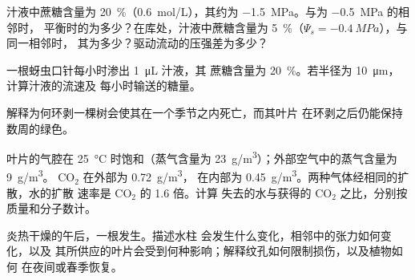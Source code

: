 \begin{exercise}[$\star\star$]\label{exo:b1:plant-transport:7}
汁液中蔗糖含量为 \qty{20}{\%}（\qty{0.6}{mol/L}），其约为
\qty{-1.5}{MPa}。与为 \qty{-0.5}{MPa} 的相邻时，
平衡时的为多少？在库处，汁液中蔗糖含量为
\qty{5}{\%}（$\Psi_s = \qty{-0.4}{MPa}$），与同一相邻时，
其为多少？驱动流动的压强差为多少？
\end{exercise}

\begin{exercise}[$\star\star$]\label{exo:b1:plant-transport:8}
一根蚜虫口针每小时渗出 \qty{1}{\micro L} 汁液，其
蔗糖含量为 \qty{20}{\%}。若半径为
\qty{10}{\micro m}，计算汁液的流速及
每小时输送的糖量。
\end{exercise}

\begin{exercise}[$\star\star$]\label{exo:b1:plant-transport:9}
解释为何环剥一棵树会使其在一个季节之内死亡，而其叶片
在环剥之后仍能保持数周的绿色。
\end{exercise}

\begin{exercise}[$\star\star\star$]\label{exo:b1:plant-transport:10}
叶片的气腔在 \qty{25}{\celsius} 时饱和（蒸气含量为
\qty{23}{g/m^3}）；外部空气中的蒸气含量为 \qty{9}{g/m^3}。
$\mathrm{CO_2}$ 在外部为 \qty{0.72}{g/m^3}，
在内部为 \qty{0.45}{g/m^3}。两种气体经相同的扩散，水的扩散
速率是 $\mathrm{CO_2}$ 的 1.6 倍。计算
失去的水与获得的 $\mathrm{CO_2}$ 之比，分别按质量和分子数计。
\end{exercise}

\begin{exercise}[$\star\star\star$]\label{exo:b1:plant-transport:11}
炎热干燥的午后，一根发生。描述水柱
会发生什么变化，相邻中的张力如何变化，以及
其所供应的叶片会受到何种影响；解释纹孔如何限制损伤，以及植物如何
在夜间或春季恢复。
\end{exercise}

